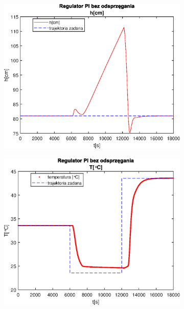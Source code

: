 \begin{figure}[h!]
   \centering
   \begin{subfigure}[b]{0.4\textwidth}
      \includegraphics[width=1\linewidth]{img/PI/noDecoupler/noDisturbance/PINoDecouplerH3Linfalse.eps}
      \caption{}
      \label{fig:fig:PINodDecoupler3Linfalse1}
   \end{subfigure}
       
   \begin{subfigure}[b]{0.4\textwidth}
      \includegraphics[width=1\linewidth]{img/PI/noDecoupler/noDisturbance/PINoDecouplerT3Linfalse.eps}
      \caption{}
      \label{fig:fig:PINodDecoupler3Linfalse2}
   \end{subfigure}
       

\end{figure}
